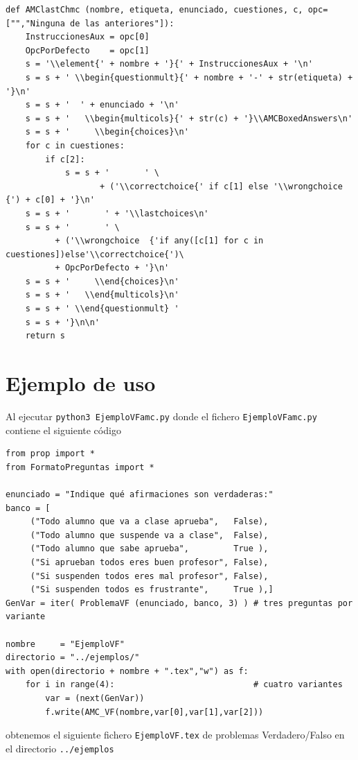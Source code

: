 \documentclass[10pt,a4paper]{report}
\begin{document}
\begin{enumerate}
\begin{verbatim}
def AMClastChmc (nombre, etiqueta, enunciado, cuestiones, c, opc=["","Ninguna de las anteriores"]):    
    InstruccionesAux = opc[0]
    OpcPorDefecto    = opc[1]
    s = '\\element{' + nombre + '}{' + InstruccionesAux + '\n'
    s = s + ' \\begin{questionmult}{' + nombre + '-' + str(etiqueta) + '}\n'
    s = s + '  ' + enunciado + '\n'
    s = s + '   \\begin{multicols}{' + str(c) + '}\\AMCBoxedAnswers\n'
    s = s + '     \\begin{choices}\n'
    for c in cuestiones:
        if c[2]: 
            s = s + '       ' \
                   + ('\\correctchoice{' if c[1] else '\\wrongchoice  {') + c[0] + '}\n'
    s = s + '       ' + '\\lastchoices\n'
    s = s + '       ' \
          + ('\\wrongchoice  {'if any([c[1] for c in cuestiones])else'\\correctchoice{')\
          + OpcPorDefecto + '}\n'
    s = s + '     \\end{choices}\n'
    s = s + '   \\end{multicols}\n'
    s = s + ' \\end{questionmult} '
    s = s + '}\n\n'
    return s
\end{verbatim}
\end{enumerate}
\section{Ejemplo de uso}
\label{sec:orgfcdaeb6}

Al ejecutar \texttt{python3 EjemploVFamc.py} donde el fichero
\texttt{EjemploVFamc.py} contiene el siguiente código
\begin{verbatim}
from prop import *
from FormatoPreguntas import *

enunciado = "Indique qué afirmaciones son verdaderas:"
banco = [
     ("Todo alumno que va a clase aprueba",   False),
     ("Todo alumno que suspende va a clase",  False),
     ("Todo alumno que sabe aprueba",         True ),
     ("Si aprueban todos eres buen profesor", False),
     ("Si suspenden todos eres mal profesor", False),
     ("Si suspenden todos es frustrante",     True ),]
GenVar = iter( ProblemaVF (enunciado, banco, 3) ) # tres preguntas por variante

nombre     = "EjemploVF"
directorio = "../ejemplos/"
with open(directorio + nombre + ".tex","w") as f:
    for i in range(4):                            # cuatro variantes
        var = (next(GenVar))
        f.write(AMC_VF(nombre,var[0],var[1],var[2]))
\end{verbatim}
obtenemos el siguiente fichero \texttt{EjemploVF.tex} de problemas
Verdadero/Falso en el directorio \texttt{../ejemplos}
\end{document}
